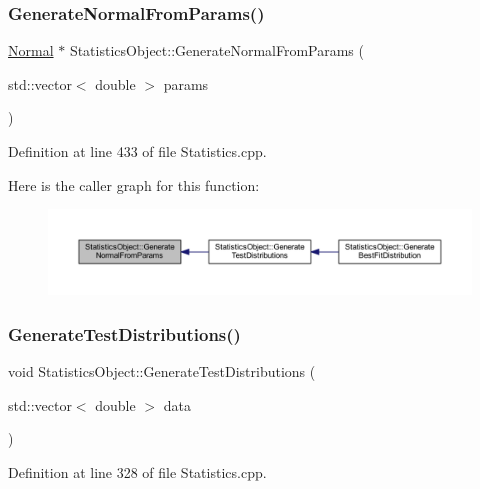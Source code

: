 \subsubsection{\texorpdfstring{Generate\+Normal\+From\+Params()}{GenerateNormalFromParams()}}
{\footnotesize\ttfamily \hyperlink{class_normal}{Normal} $\ast$ Statistics\+Object\+::\+Generate\+Normal\+From\+Params (\begin{DoxyParamCaption}\item[{std\+::vector$<$ double $>$}]{params }\end{DoxyParamCaption})}



Definition at line 433 of file Statistics.\+cpp.

Here is the caller graph for this function\+:
\nopagebreak
\begin{figure}[H]
\begin{center}
\leavevmode
\includegraphics[width=350pt]{class_statistics_object_a59cffa517dbb293e1f8fe72f2e6dd34f_icgraph}
\end{center}
\end{figure}
\mbox{\label{class_statistics_object_a7efac97d5d339216bb81bd361419799d}} 
\subsubsection{\texorpdfstring{Generate\+Test\+Distributions()}{GenerateTestDistributions()}}
{\footnotesize\ttfamily void Statistics\+Object\+::\+Generate\+Test\+Distributions (\begin{DoxyParamCaption}\item[{std\+::vector$<$ double $>$}]{data }\end{DoxyParamCaption})}



Definition at line 328 of file Statistics.\+cpp.

